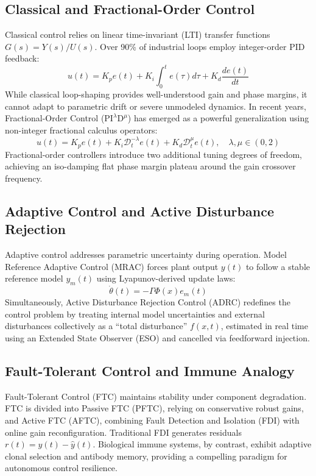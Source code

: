 \documentclass[journal,twocolumn]{IEEEtran}
\begin{document}
\subsection{Classical and Fractional-Order Control}
Classical control relies on linear time-invariant (LTI) transfer functions $G(s) = Y(s)/U(s)$. Over 90\% of industrial loops employ integer-order PID feedback:
\begin{equation}
    u(t) = K_p e(t) + K_i \int_0^t e(\tau) d\tau + K_d \frac{de(t)}{dt}
    \label{eq:pid}
\end{equation}
While classical loop-shaping provides well-understood gain and phase margins, it cannot adapt to parametric drift or severe unmodeled dynamics. In recent years, Fractional-Order Control ($\text{PI}^\lambda \text{D}^\mu$) has emerged as a powerful generalization using non-integer fractional calculus operators:
\begin{equation}
    u(t) = K_p e(t) + K_i \mathcal{D}_t^{-\lambda} e(t) + K_d \mathcal{D}_t^\mu e(t), \quad \lambda, \mu \in (0, 2)
    \label{eq:fpid}
\end{equation}
Fractional-order controllers introduce two additional tuning degrees of freedom, achieving an iso-damping flat phase margin plateau around the gain crossover frequency.

\subsection{Adaptive Control and Active Disturbance Rejection}
Adaptive control addresses parametric uncertainty during operation. Model Reference Adaptive Control (MRAC) forces plant output $y(t)$ to follow a stable reference model $y_m(t)$ using Lyapunov-derived update laws:
\begin{equation}
    \dot{\theta}(t) = -\Gamma \Phi(x) e_m(t)
    \label{eq:mrac}
\end{equation}
Simultaneously, Active Disturbance Rejection Control (ADRC) redefines the control problem by treating internal model uncertainties and external disturbances collectively as a ``total disturbance'' $f(x, t)$, estimated in real time using an Extended State Observer (ESO) and cancelled via feedforward injection.

\subsection{Fault-Tolerant Control and Immune Analogy}
Fault-Tolerant Control (FTC) maintains stability under component degradation. FTC is divided into Passive FTC (PFTC), relying on conservative robust gains, and Active FTC (AFTC), combining Fault Detection and Isolation (FDI) with online gain reconfiguration. Traditional FDI generates residuals $r(t) = y(t) - \hat{y}(t)$. Biological immune systems, by contrast, exhibit adaptive clonal selection and antibody memory, providing a compelling paradigm for autonomous control resilience.
\end{document}
